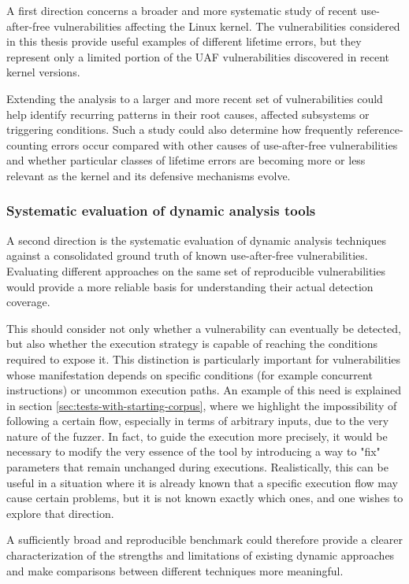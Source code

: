 A first direction concerns a broader and more systematic study of recent use-after-free vulnerabilities affecting the Linux kernel. The vulnerabilities considered in this thesis provide useful examples of different lifetime errors, but they represent only a limited portion of the UAF vulnerabilities discovered in recent kernel versions.

Extending the analysis to a larger and more recent set of vulnerabilities could help identify recurring patterns in their root causes, affected subsystems or triggering conditions. Such a study could also determine how frequently reference-counting errors occur compared with other causes of use-after-free vulnerabilities \cite{bib:use-after-free} and whether particular classes of lifetime errors are becoming more or less relevant as the kernel and its defensive mechanisms evolve.

\subsubsection{Systematic evaluation of dynamic analysis tools}

A second direction is the systematic evaluation of dynamic analysis techniques against a consolidated ground truth of known use-after-free vulnerabilities. Evaluating different approaches on the same set of reproducible vulnerabilities would provide a more reliable basis for understanding their actual detection coverage.

This should consider not only whether a vulnerability can eventually be detected, but also whether the execution strategy is capable of reaching the conditions required to expose it. This distinction is particularly important for vulnerabilities whose manifestation depends on specific conditions (for example concurrent instructions) or uncommon execution paths. An example of this need is explained in section \ref{sec:tests-with-starting-corpus}, where we highlight the impossibility of following a certain flow, especially in terms of arbitrary inputs, due to the very nature of the fuzzer. In fact, to guide the execution more precisely, it would be necessary to modify the very essence of the tool by introducing a way to "fix" parameters that remain unchanged during executions. Realistically, this can be useful in a situation where it is already known that a specific execution flow may cause certain problems, but it is not known exactly which ones, and one wishes to explore that direction.

A sufficiently broad and reproducible benchmark could therefore provide a clearer characterization of the strengths and limitations of existing dynamic approaches and make comparisons between different techniques more meaningful.

